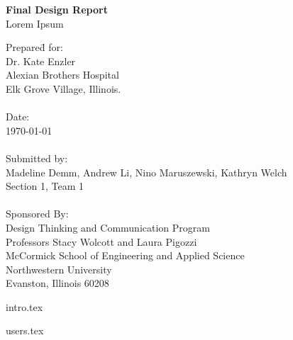 \documentclass{book}
\begin{document}

\frontmatter

\begin{titlepage}
   \begin{center}
      \huge\textbf{Final Design Report}\\
		\LARGE{Lorem Ipsum}\\  \leavevmode
   \end{center}
   
   \large
   \begin{tabbing}
	Prepare\=d for:\\
	\> Dr. Kate Enzler\\
	\> Alexian Brothers Hospital\\
	\> Elk Grove Village, Illinois.\\
	\\
	Date:\\
	\> \today\\
	\\
	Submitted by:\\
	\> Madeline Demm, Andrew Li, Nino Maruszewski, Kathryn Welch\\
	\> Section 1, Team 1\\
	\\
	Sponsored By:\\
	\> Design Thinking and Communication Program\\
	\> Professors Stacy Wolcott and Laura Pigozzi\\
	\> McCormick School of Engineering and Applied Science\\
	\> Northwestern University\\
	\> Evanston, Illinois 60208\\
	\end{tabbing}
	\normalsize
\end{titlepage}


\listoftodos
\tableofcontents

\mainmatter

{intro.tex}

{users.tex}
\end{document}
